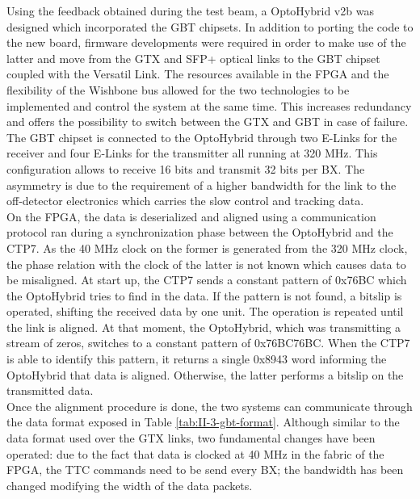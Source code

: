     Using the feedback obtained during the test beam, a OptoHybrid v2b was designed which incorporated the GBT chipsets. In addition to porting the code to the new board, firmware developments were required in order to make use of the latter and move from the GTX and SFP+ optical links to the GBT chipset coupled with the Versatil Link. The resources available in the FPGA and the flexibility of the Wishbone bus allowed for the two technologies to be implemented and control the system at the same time. This increases redundancy and offers the possibility to switch between the GTX and GBT in case of failure. \\

    The GBT chipset is connected to the OptoHybrid through two E-Links for the receiver and four E-Links for the transmitter all running at 320 MHz. This configuration allows to receive 16 bits and transmit 32 bits per BX. The asymmetry is due to the requirement of a higher bandwidth for the link to the off-detector electronics which carries the slow control and tracking data. \\

    On the FPGA, the data is deserialized and aligned using a communication protocol ran during a synchronization phase between the OptoHybrid and the CTP7. As the 40 MHz clock on the former is generated from the 320 MHz clock, the phase relation with the clock of the latter is not known which causes data to be misaligned. At start up, the CTP7 sends a constant pattern of 0x76BC which the OptoHybrid tries to find in the data. If the pattern is not found, a bitslip is operated, shifting the received data by one unit. The operation is repeated until the link is aligned. At that moment, the OptoHybrid, which was transmitting a stream of zeros, switches to a constant pattern of 0x76BC76BC. When the CTP7 is able to identify this pattern, it returns a single 0x8943 word informing the OptoHybrid that data is aligned. Otherwise, the latter performs a bitslip on the transmitted data. \\

    Once the alignment procedure is done, the two systems can communicate through the data format exposed in Table \ref{tab:II-3-gbt-format}. Although similar to the data format used over the GTX links, two fundamental changes have been operated: due to the fact that data is clocked at 40 MHz in the fabric of the FPGA, the TTC commands need to be send every BX; the bandwidth has been changed modifying the width of the data packets. \\

